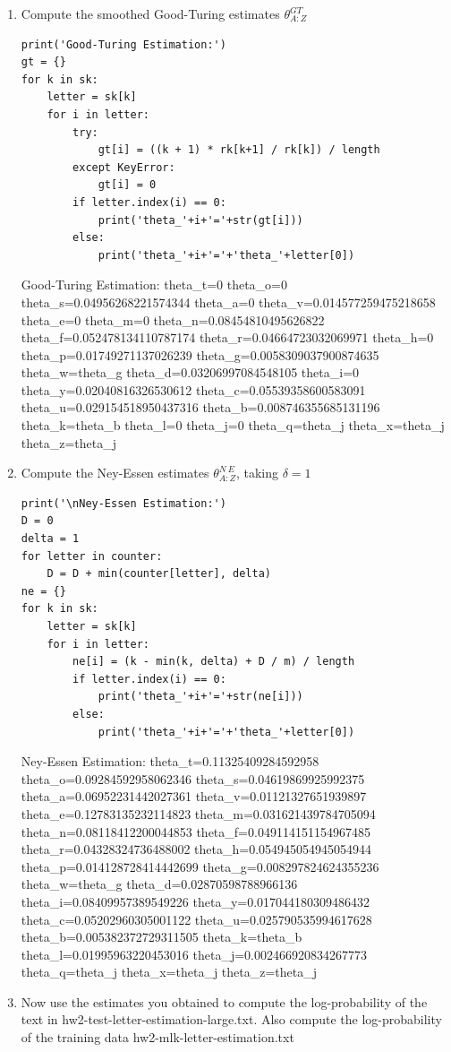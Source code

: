\documentclass[preprint,12pt]{elsarticle}
\begin{document}
\begin{enumerate}
    \item Compute the smoothed Good-Turing estimates $\theta_{A:Z}^{GT}$
    \begin{lstlisting}
print('Good-Turing Estimation:')
gt = {}
for k in sk:
    letter = sk[k]
    for i in letter:
        try: 
            gt[i] = ((k + 1) * rk[k+1] / rk[k]) / length
        except KeyError:
            gt[i] = 0
        if letter.index(i) == 0:
            print('theta_'+i+'='+str(gt[i]))
        else:
            print('theta_'+i+'='+'theta_'+letter[0])
    \end{lstlisting}
    \begin{spverbatim}
    Good-Turing Estimation:
    theta_t=0
    theta_o=0
    theta_s=0.04956268221574344
    theta_a=0
    theta_v=0.014577259475218658
    theta_e=0
    theta_m=0
    theta_n=0.08454810495626822
    theta_f=0.052478134110787174
    theta_r=0.04664723032069971
    theta_h=0
    theta_p=0.01749271137026239
    theta_g=0.0058309037900874635
    theta_w=theta_g
    theta_d=0.03206997084548105
    theta_i=0
    theta_y=0.02040816326530612
    theta_c=0.05539358600583091
    theta_u=0.029154518950437316
    theta_b=0.008746355685131196
    theta_k=theta_b
    theta_l=0
    theta_j=0
    theta_q=theta_j
    theta_x=theta_j
    theta_z=theta_j
    \end{spverbatim}

    \item Compute the Ney-Essen estimates $\theta_{A:Z}^{N\ E}$, taking
    $\delta = 1$
    \begin{lstlisting}
print('\nNey-Essen Estimation:')
D = 0
delta = 1
for letter in counter:
    D = D + min(counter[letter], delta)
ne = {}
for k in sk:
    letter = sk[k]
    for i in letter:
        ne[i] = (k - min(k, delta) + D / m) / length
        if letter.index(i) == 0:
            print('theta_'+i+'='+str(ne[i]))
        else:
            print('theta_'+i+'='+'theta_'+letter[0])
    \end{lstlisting}
    \begin{spverbatim}
    Ney-Essen Estimation:
    theta_t=0.11325409284592958
    theta_o=0.09284592958062346
    theta_s=0.04619869925992375
    theta_a=0.06952231442027361
    theta_v=0.01121327651939897
    theta_e=0.12783135232114823
    theta_m=0.031621439784705094
    theta_n=0.08118412200044853
    theta_f=0.049114151154967485
    theta_r=0.04328324736488002
    theta_h=0.054945054945054944
    theta_p=0.014128728414442699
    theta_g=0.008297824624355236
    theta_w=theta_g
    theta_d=0.02870598788966136
    theta_i=0.08409957389549226
    theta_y=0.017044180309486432
    theta_c=0.05202960305001122
    theta_u=0.025790535994617628
    theta_b=0.005382372729311505
    theta_k=theta_b
    theta_l=0.01995963220453016
    theta_j=0.002466920834267773
    theta_q=theta_j
    theta_x=theta_j
    theta_z=theta_j
    \end{spverbatim}
    \item Now use the estimates you obtained to compute the log-probability
    of the text in hw2-test-letter-estimation-large.txt. Also compute the 
    log-probability of the training data hw2-mlk-letter-estimation.txt


\end{enumerate}
\end{document}

